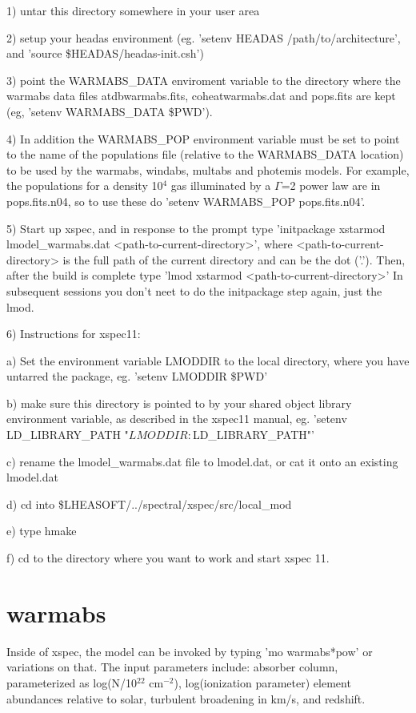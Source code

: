 1) untar this directory somewhere in your user area

2) setup your headas environment (eg. 'setenv HEADAS /path/to/architecture',
and 'source \$HEADAS/headas-init.csh')


3) point the WARMABS\_DATA enviroment variable to the directory 
where the warmabs data files atdbwarmabs.fits, coheatwarmabs.dat and 
pops.fits are kept (eg, 'setenv WARMABS\_DATA \$PWD').  

4) In addition the WARMABS\_POP environment variable must be set to point to the 
name of the populations file (relative to the WARMABS\_DATA location) to be used
by the  warmabs, windabs, multabs  and photemis models.  For example, 
the populations for a density 10$^4$ gas illuminated by a $\Gamma$=2 power law 
are in pops.fits.n04, so to use these do 'setenv WARMABS\_POP pops.fits.n04'.

5) Start up xspec, and in response to the prompt type 
'initpackage xstarmod lmodel\_warmabs.dat <path-to-current-directory>',
where <path-to-current-directory> is the full path of the current directory 
and can be the dot ('.').
Then, after the build is complete type 
'lmod xstarmod <path-to-current-directory>'
In subsequent  sessions you don't neet to do the initpackage step again, just the lmod.

6) Instructions for xspec11:

a) Set the environment variable LMODDIR to the local directory,
where you have untarred the package, eg. 
'setenv LMODDIR \$PWD'

b) make sure this directory is  pointed to by your shared object library 
environment variable, as described in the xspec11 manual, eg.
'setenv LD\_LIBRARY\_PATH "${LMODDIR}:${LD\_LIBRARY\_PATH}"'

c) rename the lmodel\_warmabs.dat file to lmodel.dat, or cat it onto an 
existing lmodel.dat

d) cd into  \$LHEASOFT/../spectral/xspec/src/local\_mod

e) type hmake 

f) cd to the directory where you want to work and start xspec 11.


\section{warmabs}

Inside of xspec, the model can be invoked by typing 
'mo warmabs*pow' or variations on that.
The input parameters include: absorber column, parameterized as 
log(N/10$^{22}$ cm$^{-2}$), log(ionization parameter) element abundances 
relative to solar, turbulent broadening in km/s, and redshift.

